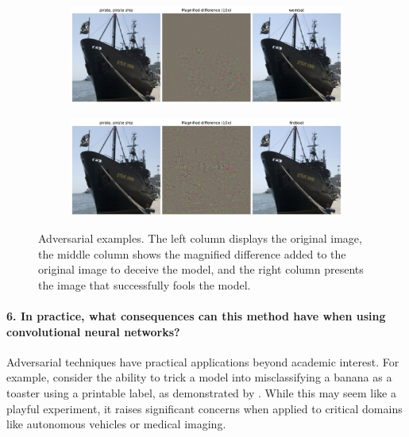 \begin{figure}[H]
    \begin{subfigure}{0.45\textwidth}
        \centering
        \includegraphics[width=\linewidth]{figs_propre2/adv_exmp3.pdf}
        \caption{}
        \label{fig:adv_exmp:sub3}
    \end{subfigure}%
    \begin{subfigure}{0.45\textwidth}
        \centering
        \includegraphics[width=\linewidth]{figs_propre2/pirate_fireboat}
        \caption{}
        \label{fig:pirate_fireboat}
    \end{subfigure}

    \caption{Adversarial examples. The left column displays the original image, the middle column shows the magnified difference added to the original image to deceive the model, and the right column presents the image that successfully fools the model.}
    \label{fig:adv_exmp}
\end{figure}

\paragraph*{6. In practice, what consequences can this method have when using convolutional neural networks?}

Adversarial techniques have practical applications beyond academic interest. For example, consider the ability to trick a model into misclassifying a banana as a toaster using a printable label, as demonstrated by \cite{brown2018adversarial}. While this may seem like a playful experiment, it raises significant concerns when applied to critical domains like autonomous vehicles or medical imaging. 

